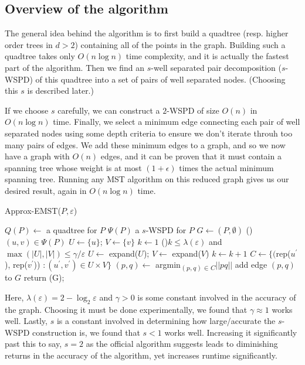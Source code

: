 \documentclass[a4paper, 10pt, twocolumn, twoside]{article}
\begin{document}
\subsection{Overview of the algorithm}

The general idea behind the algorithm is to first build a quadtree (resp. higher order trees in $d>2$) containing all of the points in the graph. Building such a quadtree takes only $O(n\log n)$ time complexity, and it is actually the fastest part of the algorithm. Then we find an $s$-well separated pair decomposition ($s$-WSPD) of this quadtree into a set of pairs of well separated nodes. (Choosing this $s$ is described later.) 

If we choose $s$ carefully, we can construct a $2$-WSPD of size $O(n)$ in $O(n\log n)$ time. Finally, we select a minimum edge connecting each pair of well separated nodes using some depth criteria to ensure we don't iterate throuh too many pairs of edges. We add these minimum edges to a graph, and so we now have a graph with $O(n)$ edges, and it can be proven that it must contain a spanning tree whose weight is at most $(1+\epsilon)$ times the actual minimum spanning tree. Running any MST algorithm on this reduced graph gives us our desired result, again in $O(n\log n)$ time.

\begin{algorithm}
\caption{Approx-EMST($P, \varepsilon$)}
\DontPrintSemicolon
$Q(P) \leftarrow $ a quadtree for $P$\;
$\Psi(P)$ a $s$-WSPD for $P$\;
$G\leftarrow(P,\emptyset)$\; 
\For(){$(u, v) \in \Psi(P)$}{
    $U \leftarrow \{u\}$; $V \leftarrow \{v\}$\;
    $k \leftarrow 1$\;
    \While(){$k \leq \lambda(\varepsilon)$ and $\max(|U|, |V|) \leq \gamma/\varepsilon$}{
        $U \leftarrow $ expand($U$); $V \leftarrow $ expand($V$)\;
        $k \leftarrow k + 1$\;
    }
    $C \leftarrow \{($rep($u^\prime$), rep($v^\prime$)) $ : (u^\prime, v^\prime) \in U \times V\}$\;
    $(p, q) \leftarrow $ argmin\textsubscript{$(p,q)\in C$}$||pq||$\;
    add edge $(p, q)$ to $G$\;
}
return \kruskals(G);
\end{algorithm}

Here, $\lambda(\varepsilon)=2-\log_2\varepsilon$ and $\gamma>0$ is some constant involved in the accuracy of the graph. Choosing it must be done experimentally, we found that $\gamma\approx 1$ works well. Lastly, $s$ is a constant involved in determining how large/accurate the $s$-WSPD construction is, we found that $s < 1$ works well. Increasing it significantly past this to say, $s=2$ as the official algorithm suggests leads to diminishing returns in the accuracy of the algorithm, yet increases runtime significantly. 
\end{document}
